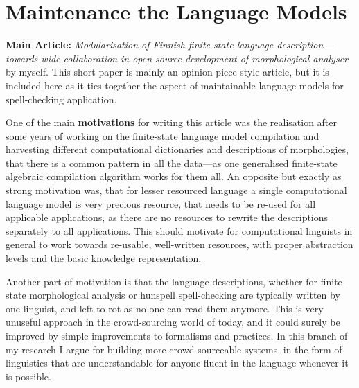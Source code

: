 \documentclass[officiallayout,draft]{unihelcompling}
\begin{document}
\section{Maintenance the Language Models}
\label{sec:maintenance}

\textbf{Main Article:} \emph{Modularisation of Finnish finite-state language 
description—towards wide collaboration in open source development of
morphological analyser} by myself. This short paper is mainly an opinion
piece style article, but it is included here as it ties together the
aspect of maintainable language models for spell-checking application.

One of the main \textbf{motivations} for writing this article was the
realisation after some years of working on the finite-state language model
compilation and harvesting different computational dictionaries and
descriptions of morphologies, that there is a common pattern in all the 
data---as one generalised finite-state algebraic compilation algorithm works
for them all. An opposite but exactly as strong motivation was, that for
lesser resourced language a single computational language model is very
precious resource, that needs to be re-used for all applicable applications,
as there are no resources to rewrite the descriptions separately to all 
applications. This should motivate for computational linguists in general to
work towards re-usable, well-written resources, with proper abstraction levels
and the basic knowledge representation.

Another part of motivation is that the language descriptions, whether for
finite-state morphological analysis or hunspell spell-checking are typically
written by one linguist, and left to rot as no one can read them anymore.
This is very unuseful approach in the crowd-sourcing world of today, and it
could surely be improved by simple improvements to formalisms and practices.
In this branch of my research I argue for building more crowd-sourceable 
systems, in the form of linguistics that are understandable for anyone
fluent in the language whenever it is possible.
\end{document}
